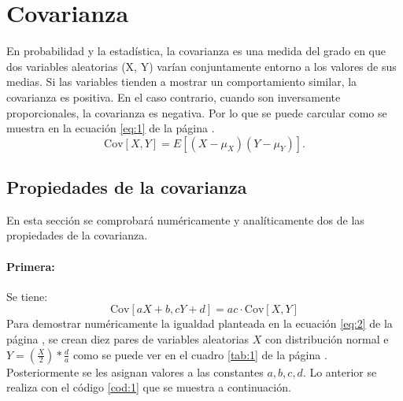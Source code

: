 \documentclass{article}
\begin{document}
\section{Covarianza}
En probabilidad y la estadística, la covarianza es una medida del grado en que dos variables aleatorias (X, Y) varían conjuntamente entorno a los valores de sus medias. Si las variables tienden a mostrar un comportamiento similar, la covarianza es positiva. En el caso contrario, cuando son inversamente proporcionales, la covarianza es negativa. Por lo que se puede carcular como se muestra en la ecuación \ref{eq:1} de la página \pageref{eq:1}.
\begin{equation}\label{eq:1}
	  \text{Cov}[X, Y] = E[(X - \mu_X)(Y -\mu_Y)]. 
\end{equation}

\subsection{Propiedades de la covarianza}
En esta sección se comprobará numéricamente y analíticamente dos de las propiedades de la covarianza. 
\paragraph{Primera:} Se tiene:
\begin{equation}\label{eq:2}
\text{Cov}[aX + b, cY + d] = ac  \cdot \text{Cov}[X, Y]  
\end{equation}
Para demostrar numéricamente la igualdad planteada en la ecuación \ref{eq:2} de la página \pageref{eq:2}, se crean diez pares de variables aleatorias $X$ con distribución normal e $Y = \left( \frac{X}{2}\right)*\frac{d}{a}$ como se puede ver en el cuadro \ref{tab:1} de la página \pageref{tab:1}. Posteriormente se les asignan valores a las constantes $a, b, c, d$. Lo anterior se realiza con el código \ref{cod:1} que se muestra a continuación.

\begin{center}

\label{cod:1}
\end{center}
\end{document}
